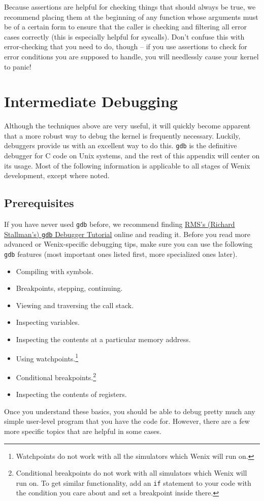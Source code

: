 Because assertions are helpful for checking things that should always be true, we recommend placing them at the beginning of any function whose arguments must be of a certain form to ensure that the caller is checking and filtering all error cases correctly (this is especially helpful for syscalls). Don't confuse this with error-checking that you need to do, though -- if you use assertions to check for error conditions you are supposed to handle, you will needlessly cause your kernel to panic!

\section{Intermediate Debugging}

Although the techniques above are very useful, it will quickly become apparent that a more robust way to debug the kernel is frequently necessary. Luckily, debuggers provide us with an excellent way to do this. \texttt{gdb} is the definitive debugger for C code on Unix systems, and the rest of this appendix will center on its usage. Most of the following information is applicable to all stages of Wenix development, except where noted.

\subsection{Prerequisites}
If you have never used \texttt{gdb} before, we recommend finding \hyperref{http://www.unknownroad.com/rtfm/gdbtut/gdbtoc.html}{}{}{RMS's (Richard Stallman's) \texttt{gdb} Debugger Tutorial} online and reading it. Before you read more advanced or Wenix-specific debugging tips, make sure you can use the following \texttt{gdb} features (most important ones listed first, more specialized ones later).
\begin{itemize}
    \item Compiling with symbols.
    \item Breakpoints, stepping, continuing.
    \item Viewing and traversing the call stack.
    \item Inspecting variables.
    \item Inspecting the contents at a particular memory address.
    \item Using watchpoints.\footnote{Watchpoints do not work with all the simulators which Wenix will run on.}
    \item Conditional breakpoints.\footnote{Conditional breakpoints do not work with all simulators which Wenix will run on. To get similar functionality, add an \texttt{if} statement to your code with the condition you care about and set a breakpoint inside there.}
    \item Inspecting the contents of registers.
\end{itemize}
Once you understand these basics, you should be able to debug pretty much any simple user-level program that you have the code for. However, there are a few more specific topics that are helpful in some cases.

